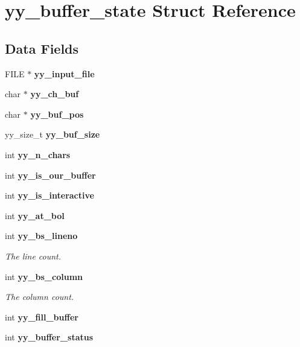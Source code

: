 \section{yy\-\_\-buffer\-\_\-state \-Struct \-Reference}
\label{structyy__buffer__state}
\subsection*{\-Data \-Fields}
\begin{DoxyCompactItemize}
\item 
\-F\-I\-L\-E $\ast$ {\bfseries yy\-\_\-input\-\_\-file}\label{structyy__buffer__state_a4843d1422e3276b636d475a3095bd948}

\item 
char $\ast$ {\bfseries yy\-\_\-ch\-\_\-buf}\label{structyy__buffer__state_ad7b8df8d8a4688e57b0b8d3ca75adc85}

\item 
char $\ast$ {\bfseries yy\-\_\-buf\-\_\-pos}\label{structyy__buffer__state_a58aa927f098b99d99e75da80f9b681ef}

\item 
yy\-\_\-size\-\_\-t {\bfseries yy\-\_\-buf\-\_\-size}\label{structyy__buffer__state_a48302f5f3477a9c78bbddf56d356ef54}

\item 
int {\bfseries yy\-\_\-n\-\_\-chars}\label{structyy__buffer__state_a06406208824817acfec2183b79080945}

\item 
int {\bfseries yy\-\_\-is\-\_\-our\-\_\-buffer}\label{structyy__buffer__state_a80ce2431c70dc4f89ced487f18449465}

\item 
int {\bfseries yy\-\_\-is\-\_\-interactive}\label{structyy__buffer__state_abf5c70eea75581b58c0ee7bd31b14490}

\item 
int {\bfseries yy\-\_\-at\-\_\-bol}\label{structyy__buffer__state_a9d60c60af6e1a6f69de16871fd64f85f}

\item 
int {\bf yy\-\_\-bs\-\_\-lineno}
\begin{DoxyCompactList}\small\item\em \-The line count. \end{DoxyCompactList}\item 
int {\bf yy\-\_\-bs\-\_\-column}
\begin{DoxyCompactList}\small\item\em \-The column count. \end{DoxyCompactList}\item 
int {\bfseries yy\-\_\-fill\-\_\-buffer}\label{structyy__buffer__state_a63d2afbb1d79a3fc63df9e12626f827d}

\item 
int {\bfseries yy\-\_\-buffer\-\_\-status}\label{structyy__buffer__state_a70fd925d37a2f0454fbd0def675d106c}

\end{DoxyCompactItemize}


